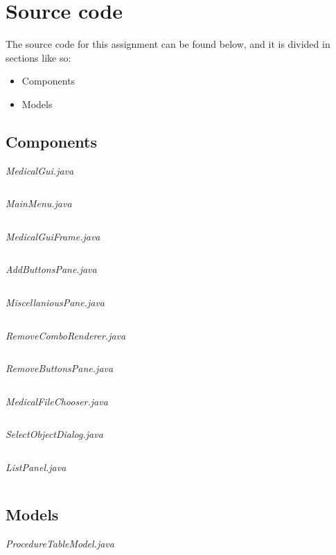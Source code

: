 \documentclass{article}
\begin{document}
\section{Source code}%
\label{sec:source_code}
The source code for this assignment can be found below, and it is divided in sections like so:
\begin{itemize}
  \item Components
  \item Models
\end{itemize}

\subsection{Components}\label{subsec:components} %
\textit{MedicalGui.java}
\inputminted{java}{./src/main/java/com/yvesstraten/medicalconsolegui/MedicalGui.java}

\textit{MainMenu.java}
\inputminted{java}{./src/main/java/com/yvesstraten/medicalconsolegui/components/MainMenu.java}

\textit{MedicalGuiFrame.java}
\inputminted{java}{./src/main/java/com/yvesstraten/medicalconsolegui/components/MedicalGuiFrame.java}

\textit{AddButtonsPane.java}
\inputminted{java}{./src/main/java/com/yvesstraten/medicalconsolegui/components/AddButtonsPane.java}

\textit{MiscellaniousPane.java}
\inputminted{java}{./src/main/java/com/yvesstraten/medicalconsolegui/components/MiscellaniousPane.java}

\textit{RemoveComboRenderer.java}
\inputminted{java}{./src/main/java/com/yvesstraten/medicalconsolegui/RemoveComboRenderer.java}

\textit{RemoveButtonsPane.java}
\inputminted{java}{./src/main/java/com/yvesstraten/medicalconsolegui/components/RemoveButtonsPane.java}

\textit{MedicalFileChooser.java}
\inputminted{java}{./src/main/java/com/yvesstraten/medicalconsolegui/components/MedicalFileChooser.java}

\textit{SelectObjectDialog.java}
\inputminted{java}{./src/main/java/com/yvesstraten/medicalconsolegui/components/SelectObjectDialog.java}

\textit{ListPanel.java}
\inputminted{java}{./src/main/java/com/yvesstraten/medicalconsolegui/components/ListPanel.java}

\subsection{Models}\label{sec:models} %
\textit{ProcedureTableModel.java}
\inputminted{java}{./src/main/java/com/yvesstraten/medicalconsolegui/models/ProcedureTableModel.java}
\end{document}
